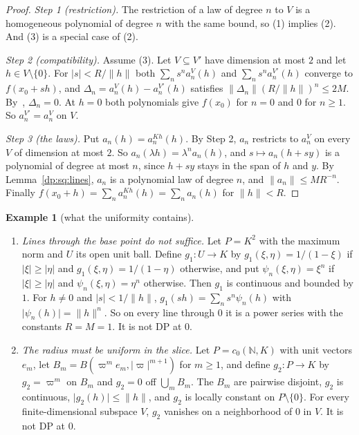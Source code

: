 \documentclass[11pt]{amsart}
\theoremstyle{definition}
\theoremstyle{remark}
\numberwithin{equation}{section}
\newcommand{\N}{\mathbb N}
\newcommand{\abs}[1]{\lvert #1\rvert}
\newcommand{\norm}[1]{\lVert #1\rVert}
\theoremstyle{plain}
\theoremstyle{definition}
\newtheorem{example}[theorem]{Example}
\theoremstyle{plain}
\begin{document}
\begin{proof}
\emph{Step 1 (restriction).} The restriction of a law of degree $n$ to $V$ is a homogeneous polynomial of degree $n$ with the same bound, so (1) implies (2). And (3) is a special case of (2).

\emph{Step 2 (compatibility).} Assume (3). Let $V\subseteq V'$ have dimension at most $2$ and let $h\in V\setminus\{0\}$. For $\abs s<R/\norm h$ both $\sum_ns^na_n^V(h)$ and $\sum_ns^na_n^{V'}(h)$ converge to $f(x_0+sh)$, and $\Delta_n=a_n^V(h)-a_n^{V'}(h)$ satisfies $\norm{\Delta_n}(R/\norm h)^n\le2M$. By~\cite[Lemma~A.1]{I}, $\Delta_n=0$. At $h=0$ both polynomials give $f(x_0)$ for $n=0$ and $0$ for $n\ge1$. So $a_n^{V'}=a_n^V$ on $V$.

\emph{Step 3 (the laws).} Put $a_n(h)=a_n^{Kh}(h)$. By Step 2, $a_n$ restricts to $a_n^V$ on every $V$ of dimension at most $2$. So $a_n(\lambda h)=\lambda^na_n(h)$, and $s\mapsto a_n(h+sy)$ is a polynomial of degree at most $n$, since $h+sy$ stays in the span of $h$ and $y$. By Lemma~\ref{dp:sq:lines}, $a_n$ is a polynomial law of degree $n$, and $\norm{a_n}\le MR^{-n}$. Finally $f(x_0+h)=\sum_na_n^{Kh}(h)=\sum_na_n(h)$ for $\norm h<R$.
\end{proof}

\begin{example}[what the uniformity contains]\label{dp:ex:slice-needed}
\leavevmode
\begin{enumerate}
\item \emph{Lines through the base point do not suffice.} Let $P=K^2$ with the maximum norm and $U$ its open unit ball. Define $g_1\colon U\to K$ by $g_1(\xi,\eta)=1/(1-\xi)$ if $\abs\xi\ge\abs\eta$ and $g_1(\xi,\eta)=1/(1-\eta)$ otherwise, and put $\psi_n(\xi,\eta)=\xi^n$ if $\abs\xi\ge\abs\eta$ and $\psi_n(\xi,\eta)=\eta^n$ otherwise. Then $g_1$ is continuous and bounded by $1$. For $h\ne0$ and $\abs s<1/\norm h$, $g_1(sh)=\sum_ns^n\psi_n(h)$ with $\abs{\psi_n(h)}=\norm h^n$. So on every line through $0$ it is a power series with the constants $R=M=1$. It is not DP at $0$.
\item \emph{The radius must be uniform in the slice.} Let $P=c_0(\N,K)$ with unit vectors $e_m$, let $B_m=B(\varpi^me_m,\abs\varpi^{m+1})$ for $m\ge1$, and define $g_2\colon P\to K$ by $g_2=\varpi^m$ on $B_m$ and $g_2=0$ off $\bigcup_mB_m$. The $B_m$ are pairwise disjoint, $g_2$ is continuous, $\abs{g_2(h)}\le\norm h$, and $g_2$ is locally constant on $P\setminus\{0\}$. For every finite-dimensional subspace $V$, $g_2$ vanishes on a neighborhood of $0$ in $V$. It is not DP at $0$.
\end{enumerate}
\end{example}
\end{document}
